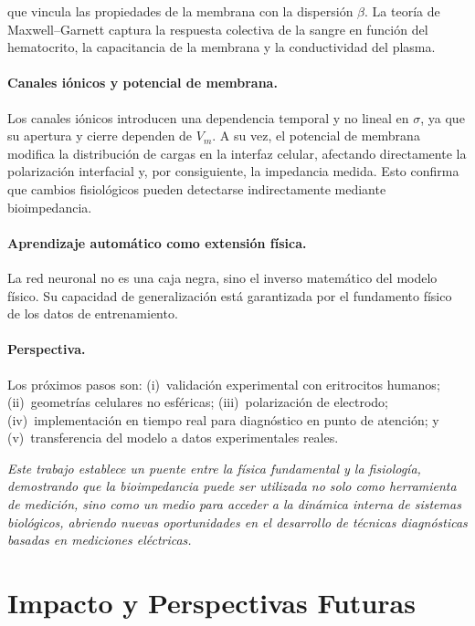 \documentclass[12pt]{article}
\begin{document}
que vincula las propiedades de la membrana con la dispersi\'on $\beta$. La
teor\'ia de Maxwell--Garnett captura la respuesta colectiva de la sangre en
funci\'on del hematocrito, la capacitancia de la membrana y la conductividad del plasma.

\paragraph{Canales i\'onicos y potencial de membrana.}
Los canales i\'onicos introducen una dependencia temporal y no lineal en $\sigma$,
ya que su apertura y cierre dependen de $V_m$. A su vez, el potencial de
membrana modifica la distribuci\'on de cargas en la interfaz celular, afectando
directamente la polarizaci\'on interfacial y, por consiguiente, la impedancia medida.
Esto confirma que cambios fisiol\'ogicos pueden detectarse indirectamente mediante
bioimpedancia.

\paragraph{Aprendizaje autom\'atico como extensi\'on f\'isica.}
La red neuronal no es una caja negra, sino el inverso matem\'atico del modelo
f\'isico. Su capacidad de generalizaci\'on est\'a garantizada por el fundamento
f\'isico de los datos de entrenamiento.

\paragraph{Perspectiva.}
Los pr\'oximos pasos son: (i)~validaci\'on experimental con eritrocitos humanos;
(ii)~geometr\'ias celulares no esf\'ericas; (iii)~polarizaci\'on de electrodo;
(iv)~implementaci\'on en tiempo real para diagn\'ostico en punto de atenci\'on;
y (v)~transferencia del modelo a datos experimentales reales.

\begin{center}
\textit{
Este trabajo establece un puente entre la f\'isica fundamental y la fisiolog\'ia,
demostrando que la bioimpedancia puede ser utilizada no solo como herramienta
de medici\'on, sino como un medio para acceder a la din\'amica interna de sistemas biol\'ogicos, abriendo nuevas oportunidades en el desarrollo de t\'ecnicas
diagn\'osticas basadas en mediciones el\'ectricas.
}
\end{center}

\section{Impacto y Perspectivas Futuras}
\end{document}
